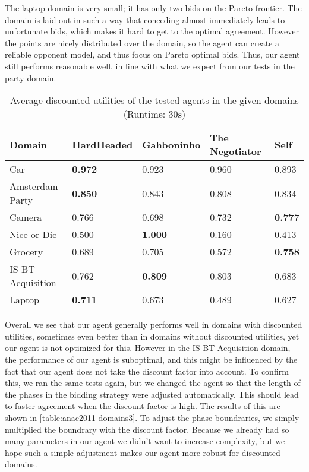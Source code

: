 The laptop domain is very small; it has only two bids on the Pareto frontier. The domain is laid out in such a way that conceding almost immediately leads to unfortunate bids, which makes it hard to get to the optimal agreement. However the points are nicely distributed over the domain, so the agent can create a reliable opponent model, and thus focus on Pareto optimal bids. Thus, our agent still performs reasonable well, in line with what we expect from our tests in the party domain.

\begin{table}[H]
  \centering
  \small
  \begin{tabular}{lp{2.5cm}p{2.5cm}p{2.5cm}p{2.5cm}}
  \toprule
  Domain                    & HardHeaded     & Gahboninho     & The Negotiator & Self \\ 
  \midrule
  Car                       & \textbf{0.972} & 0.923          & 0.960          & 0.893 \\
  Amsterdam Party           & \textbf{0.850} & 0.843          & 0.808          & 0.834 \\ 
  Camera                    & 0.766          & 0.698          & 0.732          & \textbf{0.777} \\ 
  Nice or Die               & 0.500          & \textbf{1.000} & 0.160          & 0.413 \\ 
  Grocery                   & 0.689          & 0.705          & 0.572          & \textbf{0.758} \\ 
  IS BT Acquisition         & 0.762          & \textbf{0.809} & 0.803          & 0.683 \\ 
  Laptop                    & \textbf{0.711} & 0.673          & 0.489          & 0.627 \\ 
  \bottomrule
  \end{tabular}
  \caption{Average discounted utilities of the tested agents in the given domains (Runtime: $30$s) \label{table:anac2011-domains2}}
\end{table}

Overall we see that our agent generally performs well in domains with discounted utilities, sometimes even better than in domains without discounted utilities, yet our agent is not optimized for this. However in the IS BT Acquisition domain, the performance of our agent is suboptimal, and this might be influenced by the fact that our agent does not take the discount factor into account. To confirm this, we ran the same tests again, but we changed the agent so that the length of the phases in the bidding strategy were adjusted automatically. This should lead to faster agreement when the discount factor is high. The results of this are shown in \autoref{table:anac2011-domains3}. To adjust the phase boundraries, we simply multiplied the boundrary with the discount factor.
Because we already had so many parameters in our agent we didn't want to increase complexity, but we hope such a simple adjustment makes our agent more robust for discounted domains.

